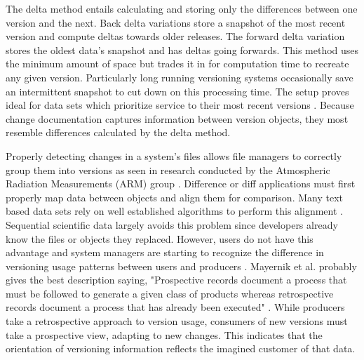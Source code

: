 The delta method entails calculating and storing only the differences between one version and the next.
Back delta variations store a snapshot of the most recent version and compute deltas towards older releases.
The forward delta variation stores the oldest data's snapshot and has deltas going forwards.
This method uses the minimum amount of space but trades it in for computation time to recreate any given version.
Particularly long running versioning systems occasionally save an intermittent snapshot to cut down on this processing time.
The setup proves ideal for data sets which prioritize service to their most recent versions \cite{Stuckenholz:2005:CEV:1039174.1039197}.
Because change documentation captures information between version objects, they most resemble differences calculated by the delta method.

Properly detecting changes in a system's files allows file managers to correctly group them into versions as seen in research conducted by the Atmospheric Radiation Measurements (ARM) group \cite{6906868}.
Difference or diff applications must first properly map data between objects and align them for comparison.
Many text based data sets rely on well established algorithms to perform this alignment  \cite{Chien:2000:VMX:646544.696357} \cite{Hartung201315}.
Sequential scientific data largely avoids this problem since developers already know the files or objects they replaced.
However, users do not have this advantage and system managers are starting to recognize the difference in versioning usage patterns between users and producers \cite{Branco2008}.
Mayernik et al. probably gives the best description saying, "Prospective records document a process that must be followed to generate a given class of products whereas retrospective records document a process that has already been executed" \cite{MatthewS.Mayernik201312-039}.
While producers take a retrospective approach to version usage, consumers of new versions must take a prospective view, adapting to new changes.
This indicates that the orientation of versioning information reflects the imagined customer of that data.


